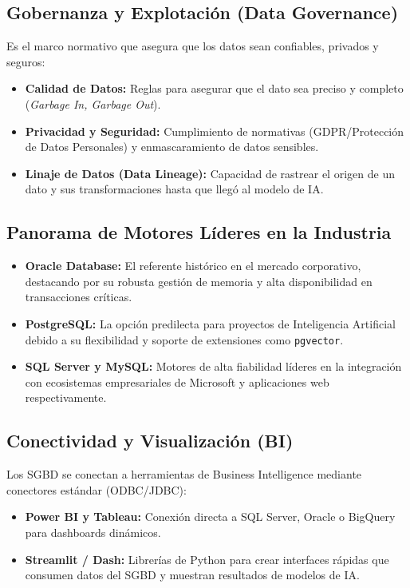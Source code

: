 \documentclass[12pt,a4paper,openany,oneside]{book}
\begin{document}
\subsection{Gobernanza y Explotación (Data Governance)}
Es el marco normativo que asegura que los datos sean confiables, privados y seguros:
\begin{itemize}
    \item \textbf{Calidad de Datos:} Reglas para asegurar que el dato sea preciso y completo (\textit{Garbage In, Garbage Out}).
    \item \textbf{Privacidad y Seguridad:} Cumplimiento de normativas (GDPR/Protección de Datos Personales) y enmascaramiento de datos sensibles.
    \item \textbf{Linaje de Datos (Data Lineage):} Capacidad de rastrear el origen de un dato y sus transformaciones hasta que llegó al modelo de IA.
\end{itemize}


\subsection{Panorama de Motores Líderes en la Industria}
\begin{itemize}
    \item \textbf{Oracle Database:} El referente histórico en el mercado corporativo, destacando por su robusta gestión de memoria y alta disponibilidad en transacciones críticas.
    \item \textbf{PostgreSQL:} La opción predilecta para proyectos de Inteligencia Artificial debido a su flexibilidad y soporte de extensiones como \texttt{pgvector}.
    \item \textbf{SQL Server y MySQL:} Motores de alta fiabilidad líderes en la integración con ecosistemas empresariales de Microsoft y aplicaciones web respectivamente.
\end{itemize}

\subsection{Conectividad y Visualización (BI)}
Los SGBD se conectan a herramientas de Business Intelligence mediante conectores estándar (ODBC/JDBC):
\begin{itemize}
    \item \textbf{Power BI y Tableau:} Conexión directa a SQL Server, Oracle o BigQuery para dashboards dinámicos.
    \item \textbf{Streamlit / Dash:} Librerías de Python para crear interfaces rápidas que consumen datos del SGBD y muestran resultados de modelos de IA.
\end{itemize}
\end{document}

